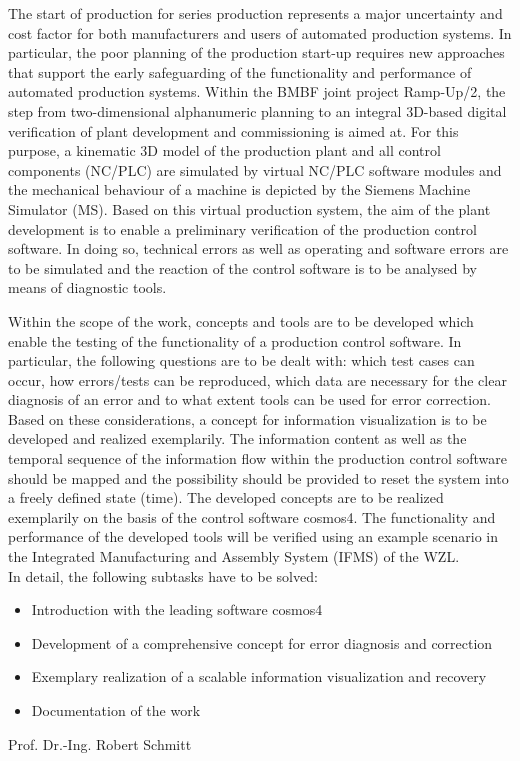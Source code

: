 \documentclass[
    a4paper,        %
    11pt,           %
    en,             %
    usefiramath,    %
    sans,           %
    openright
    ]{format/WZLTemplate}
\begin{document}
The start of production for series production represents a major uncertainty and cost factor for both manufacturers and users of automated production systems. In particular, the poor planning of the production start-up requires new approaches that support the early safeguarding of the functionality and performance of automated production systems. Within the BMBF joint project Ramp-Up/2, the step from two-dimensional alphanumeric planning to an integral 3D-based digital verification of plant development and commissioning is aimed at. For this purpose, a kinematic 3D model of the production plant and all control components (NC/PLC) are simulated by virtual NC/PLC software modules and the mechanical behaviour of a machine is depicted by the Siemens Machine Simulator (MS). Based on this virtual production system, the aim of the plant development is to enable a preliminary verification of the production control software. In doing so, technical errors as well as operating and software errors are to be simulated and the reaction of the control software is to be analysed by means of diagnostic tools.

Within the scope of the work, concepts and tools are to be developed which enable the testing of the functionality of a production control software. In particular, the following questions are to be dealt with: which test cases can occur, how errors/tests can be reproduced, which data are necessary for the clear diagnosis of an error and to what extent tools can be used for error correction. Based on these considerations, a concept for information visualization is to be developed and realized exemplarily. The information content as well as the temporal sequence of the information flow within the production control software should be mapped and the possibility should be provided to reset the system into a freely defined state (time). The developed concepts are to be realized exemplarily on the basis of the control software cosmos4. The functionality and performance of the developed tools will be verified using an example scenario in the Integrated Manufacturing and Assembly System (IFMS) of the WZL.\\

In detail, the following subtasks have to be solved:\\
\begin{itemize}
	\item Introduction with the leading software cosmos4
	\item Development of a comprehensive concept for error diagnosis and correction
	\item Exemplary realization of a scalable information visualization and recovery
	\item Documentation of the work
\end{itemize}
\vspace{4cm}

Prof. Dr.-Ing. Robert Schmitt
\end{document}
